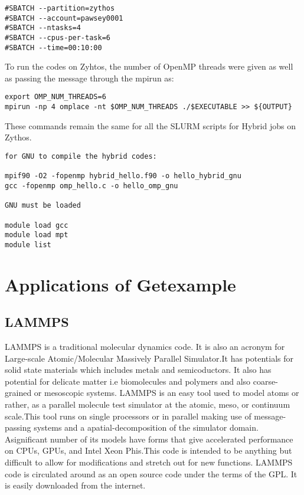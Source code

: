 \documentclass[journal]{IEEEtran}
\begin{document}
{\begin{verbatim}
#SBATCH --partition=zythos
#SBATCH --account=pawsey0001
#SBATCH --ntasks=4
#SBATCH --cpus-per-task=6
#SBATCH --time=00:10:00
\end{verbatim}

To run the codes on Zyhtos, the number of OpenMP threads were given as well as passing the message through the mpirun as:

\begin{verbatim}
export OMP_NUM_THREADS=6
mpirun -np 4 omplace -nt $OMP_NUM_THREADS ./$EXECUTABLE >> ${OUTPUT}
\end{verbatim}

These commands remain the same for all the SLURM scripts for Hybrid jobs on Zythos.

\begin{verbatim}
for GNU to compile the hybrid codes:

mpif90 -O2 -fopenmp hybrid_hello.f90 -o hello_hybrid_gnu
gcc -fopenmp omp_hello.c -o hello_omp_gnu

GNU must be loaded
 
module load gcc
module load mpt
module list
\end{verbatim}

\section{Applications of Getexample}

\subsection{LAMMPS}

LAMMPS is a traditional molecular dynamics code. It is also an acronym for Large-scale Atomic/Molecular Massively Parallel Simulator.It has potentials for solid state materials which includes metals and semicoductors. It also has potential for delicate matter i.e biomolecules and polymers and also coarse-grained or mesoscopic systems.
LAMMPS is an easy tool used to model atoms or rather, as a parallel molecule test simulator at the atomic, meso, or continuum scale.This tool runs on single processors or in parallel making use of message-passing systems and a apatial-decomposition of the simulator domain.
Asignificant number of its models have forms that give accelerated performance on CPUs, GPUs, and Intel Xeon Phis.This code is intended to be anything but difficult to allow for modifications and stretch out for new functions.
LAMMPS code is circulated around as an open source code under the terms of the GPL. It is easily downloaded from the internet.

}
\end{document}
